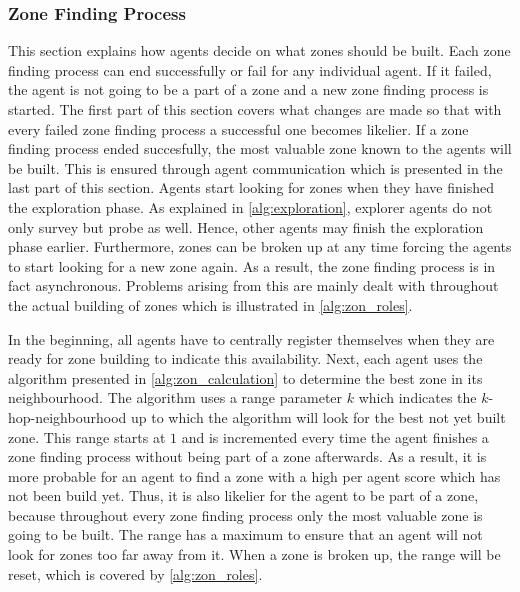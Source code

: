 \subsubsection{Zone Finding Process}\label{alg:zon_finding}
This section explains how agents decide on what zones should be built. Each zone finding process can end successfully or fail for any individual agent. If it failed, the agent is not going to be a part of a zone and a new zone finding process is started. The first part of this section covers what changes are made so that with every failed zone finding process a successful one becomes likelier. If a zone finding process ended succesfully, the most valuable zone known to the agents will be built. This is ensured through agent communication which is presented in the last part of this section.
Agents start looking for zones when they have finished the exploration phase. As explained in \autoref{alg:exploration}, explorer agents do not only survey but probe as well. Hence, other agents may finish the exploration phase earlier. Furthermore, zones can be broken up at any time forcing the agents to start looking for a new zone again. As a result, the zone finding process is in fact asynchronous. Problems arising from this are mainly dealt with throughout the actual building of zones which is illustrated in \autoref{alg:zon_roles}.

In the beginning, all agents have to centrally register themselves when they are ready for zone building to indicate this availability. Next, each agent uses the algorithm presented in \autoref{alg:zon_calculation} to determine the best zone in its neighbourhood. The algorithm uses a range parameter $k$ which indicates the $k$-hop-neighbourhood up to which the algorithm will look for the best not yet built zone. This range starts at $1$ and is incremented every time the agent finishes a zone finding process without being part of a zone afterwards. As a result, it is more probable for an agent to find a zone with a high per agent score which has not been build yet. Thus, it is also likelier for the agent to be part of a zone, because throughout every zone finding process only the most valuable zone is going to be built. The range has a maximum to ensure that an agent will not look for zones too far away from it. When a zone is broken up, the range will be reset, which is covered by \autoref{alg:zon_roles}.

